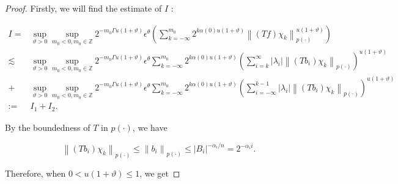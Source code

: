 \documentclass[oneside,reqno]{amsart}
\numberwithin{equation}{section}
\theoremstyle{definition}
\begin{document}
\begin{proof}
Firstly, we will find the  estimate of $I$ :


\begin{align*}
I= & \sup_{\vartheta>0 }\sup _{m_0<0, m_0\in  \mathbb{Z}} 2^{-m_0\Gamma u(1+\vartheta)} \epsilon  ^\theta \left(\sum_{k=-\infty}^{m_0} 2^{k  \alpha(0) u(1+\vartheta)}\left\|(T f) \chi_{k}\right\|_{{p(\cdot)}}^{u(1+\vartheta)}\right) \\
\lesssim & \sup_{\vartheta>0 }\sup _{m_0<0, m_0\in  \mathbb{Z}} 2^{-m_0\Gamma u(1+\vartheta)} \epsilon  ^\theta\sum_{k=-\infty}^{m_0} 2^{k \alpha(0) u(1+\vartheta)}\left(\sum_{i=k}^{\infty}\left|\lambda_{i}\right|\left\|\left(T b_{i}\right) \chi_{k}\right\|_{{p(\cdot)}}\right)^{u(1+\vartheta)} \\
+& \sup_{\vartheta>0 }\sup _{m_0<0, m_0\in  \mathbb{Z}} 2^{-m_0\Gamma u(1+\vartheta)} \epsilon  ^\theta \sum_{k=-\infty}^{m_0} 2^{k \alpha(0) u(1+\vartheta)}\left(\sum_{i=-\infty}^{k-1}\left|\lambda_{i}\right|\left\|\left(T b_{i}\right) \chi_{k}\right\|_{{p(\cdot)}}\right)^{u(1+\vartheta)} \\
:= & I_{1}+I_{2} . 
\end{align*}


By the boundedness of $T$ in ${p(\cdot)}$, we have


\begin{equation*}
\left\|\left(T b_{i}\right) \chi_{k}\right\|_{{p(\cdot)}} \leq \left\|b_{i}\right\|_{{p(\cdot)}} \leq \left|B_{i}\right|^{-\alpha_{i} / n}=2^{-\alpha_{i} i} . 
\end{equation*}


Therefore, when $0<u(1+\vartheta) \leq  1$, we get



\end{proof}
\end{document}
